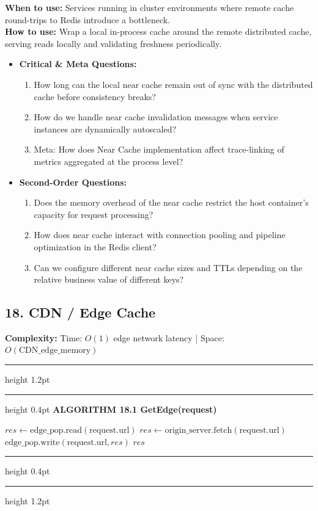 \documentclass[11pt,a4paper]{article}
\newenvironment{textbookalgo}[2]{%
  \par\addvspace{1.2em}\noindent
  \hrule height 1.2pt
  \vspace{1.5pt}
  \hrule height 0.4pt
  \vspace{5pt}
  {\noindent\large\bfseries\sffamily ALGORITHM #1 \quad #2}
  \par\vspace{5pt}
  \RestyleAlgo{plain}
}{%
  \par\vspace{4pt}
  \hrule height 0.4pt
  \vspace{1.5pt}
  \hrule height 1.2pt
  \par\addvspace{1.2em}
}
\theoremstyle{definition}
\begin{document}
\noindent
\textbf{When to use:} Services running in cluster environments where remote cache round-trips to Redis introduce a bottleneck.\\
\textbf{How to use:} Wrap a local in-process cache around the remote distributed cache, serving reads locally and validating freshness periodically.
\begin{itemize}[leftmargin=*]
  \item[] \textbf{Critical \& Meta Questions:}
  \begin{enumerate}
  \item How long can the local near cache remain out of sync with the distributed cache before consistency breaks?
  \item How do we handle near cache invalidation messages when service instances are dynamically autoscaled?
  \item Meta: How does Near Cache implementation affect trace-linking of metrics aggregated at the process level?
  \end{enumerate}
  \item[] \textbf{Second-Order Questions:}
  \begin{enumerate}
  \item Does the memory overhead of the near cache restrict the host container's capacity for request processing?
  \item How does near cache interact with connection pooling and pipeline optimization in the Redis client?
  \item Can we configure different near cache sizes and TTLs depending on the relative business value of different keys?
  \end{enumerate}
\end{itemize}
\medskip

\clearpage
\subsection{18. CDN / Edge Cache}

\noindent
\textbf{Complexity:} Time: $O(1)$ edge network latency | Space: $O(\text{CDN\_edge\_memory})$
\smallskip

\begin{textbookalgo}{18.1}{GetEdge(request)}
\begin{algorithm}[H]
$res \leftarrow \text{edge\_pop.read}(\text{request.url})$\;
$res \leftarrow \text{origin\_server.fetch}(\text{request.url})$\;
$\text{edge\_pop.write}(\text{request.url}, res)$\;
\Return $res$\;
\end{algorithm}
\end{textbookalgo}
\end{document}
